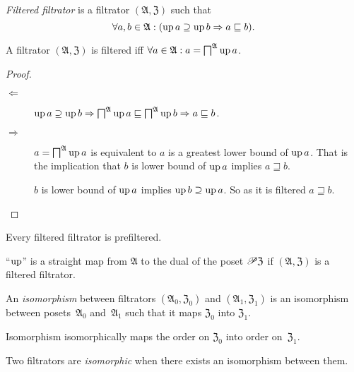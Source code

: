 \begin{defn}
\emph{Filtered filtrator} is a filtrator
$(\mathfrak{A},\mathfrak{Z})$ such that
\[
\forall a,b\in\mathfrak{A}:(\operatorname{up} a\supseteq\operatorname{up} b\Rightarrow a\sqsubseteq b).
\]
\end{defn}
\begin{thm}
A filtrator $(\mathfrak{A},\mathfrak{Z})$ is filtered iff $\forall a\in\mathfrak{A}:a=\bigsqcap^{\mathfrak{A}}\operatorname{up} a$.\end{thm}
\begin{proof}
~
\begin{description}
\item [{$\Leftarrow$}] $\operatorname{up} a\supseteq\operatorname{up} b\Rightarrow\bigsqcap^{\mathfrak{A}}\operatorname{up} a\sqsubseteq\bigsqcap^{\mathfrak{A}}\operatorname{up} b\Rightarrow a\sqsubseteq b$.
\item [{$\Rightarrow$}] $a=\bigsqcap^{\mathfrak{A}}\operatorname{up} a$ is equivalent
to $a$ is a greatest lower bound of $\operatorname{up} a$. That is the implication
that $b$ is lower bound of $\operatorname{up} a$ implies $a\sqsupseteq b$.


$b$ is lower bound of $\operatorname{up} a$ implies $\operatorname{up} b\supseteq\operatorname{up} a$. So
as it is filtered $a\sqsupseteq b$.

\end{description}
\end{proof}
\begin{obvious}
Every filtered filtrator is prefiltered.
\end{obvious}

\begin{obvious}
\label{up-straight}``$\operatorname{up}$'' is a straight map from $\mathfrak{A}$
to the dual of the poset $\mathscr{P}\mathfrak{Z}$ if $(\mathfrak{A},\mathfrak{Z})$
is a filtered filtrator.\end{obvious}
\begin{defn}
An \emph{isomorphism} between filtrators $(\mathfrak{A}_{0},\mathfrak{Z}_{0})$
and $(\mathfrak{A}_{1},\mathfrak{Z}_{1})$ is an isomorphism between
posets~$\mathfrak{A}_{0}$ and~$\mathfrak{A}_{1}$ such that it
maps $\mathfrak{Z}_{0}$ into $\mathfrak{Z}_{1}$.\end{defn}
\begin{obvious}
Isomorphism isomorphically maps the order on $\mathfrak{Z}_{0}$ into
order on~$\mathfrak{Z}_{1}$.\end{obvious}
\begin{defn}
Two filtrators are \emph{isomorphic} when there exists an isomorphism
between them.
\end{defn}

